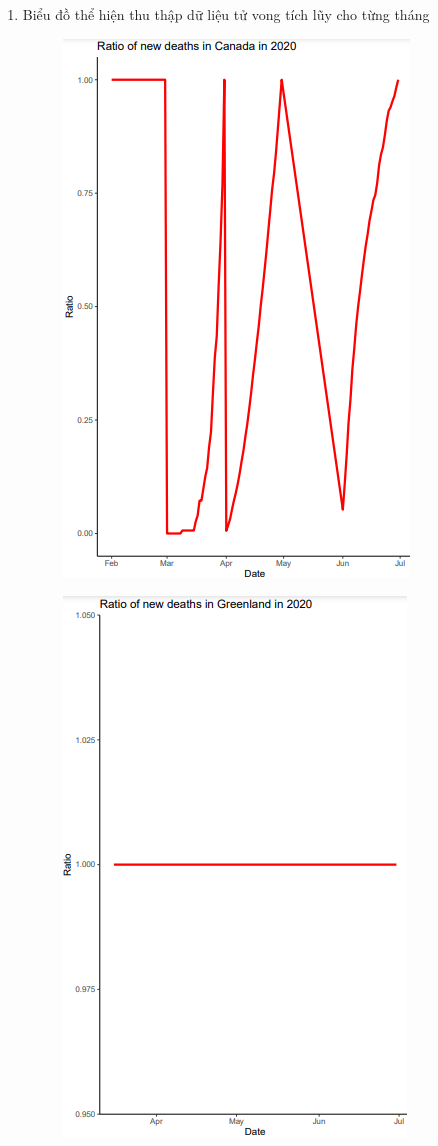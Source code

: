 \documentclass[a4paper]{article}
\theoremstyle{definition}
\begin{document}
\begin{enumerate}[i)]
\begin{enumerate}[1]
\begin{figure}[H]
			\end{figure}
			\item Biểu đồ thể hiện thu thập dữ liệu tử vong tích lũy cho từng tháng
			\begin{figure}[H]
				\centering
				\includegraphics[scale=0.8]{images/5.8.1.png}
			\end{figure}
			\begin{figure}[H]
				\centering
				\includegraphics[scale=0.8]{images/5.8.2.png}

\end{figure}
\end{enumerate}
\end{enumerate}
\end{document}
